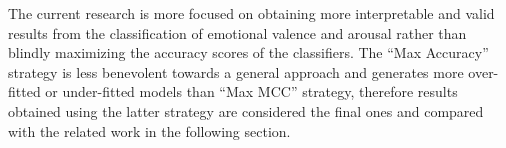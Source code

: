The current research is more focused on obtaining more interpretable and valid results from the classification of emotional valence and arousal rather than blindly maximizing the accuracy scores of the classifiers. The “Max Accuracy” strategy is less benevolent towards a general approach and generates more over-fitted or under-fitted models than “Max MCC” strategy, therefore results obtained using the latter strategy are considered the final ones and compared with the related work in the following section.
\fi
